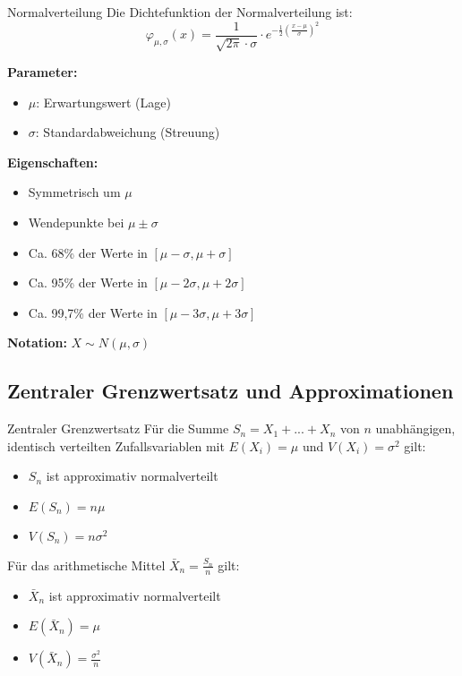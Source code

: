\begin{definition}{Normalverteilung}
Die Dichtefunktion der Normalverteilung ist:
$$\varphi_{\mu,\sigma}(x) = \frac{1}{\sqrt{2\pi} \cdot \sigma} \cdot e^{-\frac{1}{2}(\frac{x-\mu}{\sigma})^2}$$

\textbf{Parameter:}
\begin{itemize}
    \item $\mu$: Erwartungswert (Lage)
    \item $\sigma$: Standardabweichung (Streuung)
\end{itemize}

\textbf{Eigenschaften:}
\begin{itemize}
    \item Symmetrisch um $\mu$
    \item Wendepunkte bei $\mu \pm \sigma$
    \item Ca. 68\% der Werte in $[\mu-\sigma, \mu+\sigma]$
    \item Ca. 95\% der Werte in $[\mu-2\sigma, \mu+2\sigma]$
    \item Ca. 99,7\% der Werte in $[\mu-3\sigma, \mu+3\sigma]$
\end{itemize}

\textbf{Notation:} $X \sim N(\mu,\sigma)$
\end{definition}

\subsection{Zentraler Grenzwertsatz und Approximationen}

\begin{theorem}{Zentraler Grenzwertsatz}
Für die Summe $S_n = X_1 + ... + X_n$ von $n$ unabhängigen, identisch verteilten Zufallsvariablen mit $E(X_i)=\mu$ und $V(X_i)=\sigma^2$ gilt:

\begin{itemize}
    \item $S_n$ ist approximativ normalverteilt
    \item $E(S_n) = n\mu$
    \item $V(S_n) = n\sigma^2$
\end{itemize}

Für das arithmetische Mittel $\bar{X}_n = \frac{S_n}{n}$ gilt:
\begin{itemize}
    \item $\bar{X}_n$ ist approximativ normalverteilt
    \item $E(\bar{X}_n) = \mu$
    \item $V(\bar{X}_n) = \frac{\sigma^2}{n}$
\end{itemize}
\end{theorem}

